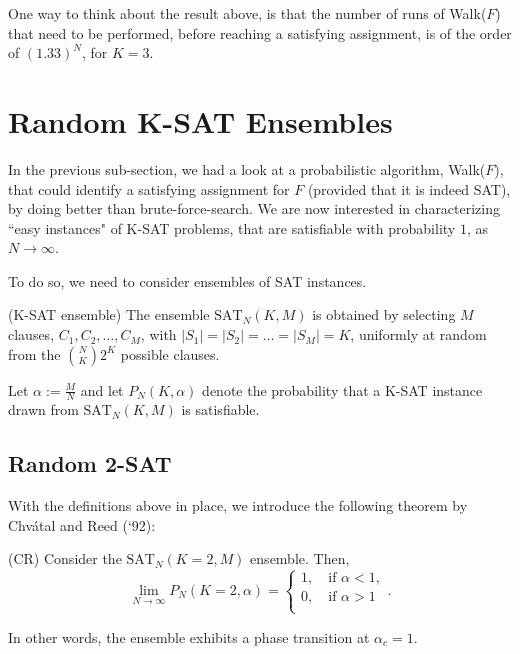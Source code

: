 \documentclass[letterpaper,english,11pt]{article}
\begin{document}
\begin{rem}
One way to think about the result above, is that the  number of runs of Walk($F$) that need to be performed, before reaching a satisfying assignment, is of the order of $(1.33)^{N}$, for $K=3$.
\end{rem}
\section{Random K-SAT Ensembles}

In the previous sub-section, we had a look at a probabilistic algorithm, Walk($F$), that could identify a satisfying assignment for $F$ (provided that it is indeed SAT), by doing better than brute-force-search. We are now interested in characterizing ``easy instances" of K-SAT problems, that are satisfiable with probability $1$, as $N\rightarrow \infty$.

To do so, we need to consider ensembles of SAT instances.

\begin{defn}(K-SAT ensemble)
The ensemble $\text{SAT}_N(K,M)$ is obtained by selecting $M$ clauses, $C_1,C_2,\ldots,C_M$, with $|S_1|=|S_2|=\ldots=|S_M|=K$, uniformly at random from the ${N\choose K}2^{K}$ possible clauses.
\end{defn}

Let $\alpha:=\frac{M}{N}$ and let $P_{N}(K,\alpha)$ denote the probability that a K-SAT instance drawn from $\text{SAT}_N(K,M)$ is satisfiable.

\subsection{Random 2-SAT}

With the definitions above in place, we introduce the following theorem by Chv\'atal and Reed (`92):

\begin{thm} (CR)\label{CR}
Consider the $\text{SAT}_N(K=2,M)$ ensemble. Then,
\begin{equation*}
    \lim_{N\rightarrow \infty} P_{N}(K=2,\alpha) = \begin{cases}
    1,\quad \text{if }\alpha<1,\\
    0,\quad \text{if }\alpha>1\\
    \end{cases}.
\end{equation*}

In other words, the ensemble exhibits a phase transition at $\alpha_c=1$.
\end{thm}
\end{document}
